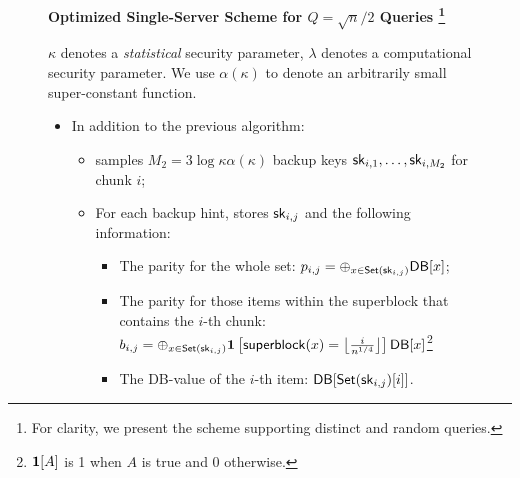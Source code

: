\begin{figure}[p]
    
    \begin{minipage}{\textwidth}
        \begin{mdframed}
            \label{alg:optimized:full}
            \begin{center}
                {\bf Optimized Single-Server Scheme for $Q=\sqrt{n}/2$ Queries
                    \footnote{For clarity, we present the scheme supporting distinct and random queries.}
                }
            \end{center}
            $\kappa$ denotes a {\it statistical} security parameter, $\lambda$
            denotes a computational security parameter. We use $\alpha(\kappa)$
            to denote an arbitrarily small super-constant function.
            
            
            \begin{itemize}[leftmargin=3mm,itemsep=1pt]
                \item In addition to the previous algorithm:
                \begin{itemize}
                    \item \Client samples $M_2=3\log \kappa \alpha(\kappa)$
                    backup keys $\mathsf{sk}_{i,1},\dots,\mathsf{sk}_{i,M_2}$ for chunk $i$;
                    \item For each backup hint, \Client stores $\mathsf{sk}_{i, j}$ and
                    the following information:
                    \begin{itemize}
                        \item The parity for the whole set: $p_{i,j}=\oplus_{x\in
                        \mathsf{Set}(\mathsf{sk}_{i,j})} \mathsf{DB}[x]$;
                        \item The parity for those items within the superblock
                        that contains the $i$-th chunk: $b_{i,j}=\oplus_{x\in
                        \mathsf{Set}(\mathsf{sk}_{i,j})} \mathbf{1}\left[\mathsf{superblock}(x) = \left\lfloor
                        \frac{i}{n^{1/4}} \right\rfloor
                        \right]\mathsf{DB}[x]$\footnote{$\mathbf{1}[A]$ is 1 when $A$ is true
                        and 0 otherwise.}
                       
                        \item The DB-value of the $i$-th item:
                        $\mathsf{DB}[\mathsf{Set}(\mathsf{sk}_{i,j})[i]]$. 
                    \end{itemize}
                \end{itemize}  
                

\end{itemize}
\end{mdframed}
\end{minipage}
\end{figure}
